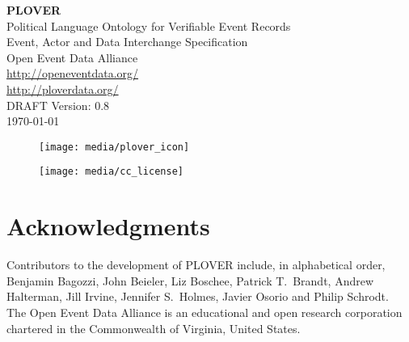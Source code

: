 \documentclass[11pt]{report}
\begin{document}

\vspace{-10pt}	

      \begin{center}
            {\Huge \bfseries PLOVER\ }\\[2ex] 
            {\LARGE Political Language Ontology for Verifiable Event Records\\ [2ex]Event, Actor and Data Interchange Specification}\\[10ex] 
            {\LARGE Open Event Data Alliance} \\[2ex] 
            {\Large \url{http://openeventdata.org/} }\\[2ex] 
            {\Large \url{http://ploverdata.org/} }\\[6ex]            
            {\LARGE DRAFT Version: 0.8\\ [2EX]\monthyeardate\today}
        \end{center}


\begin{figure}[h!]
\centering
\texttt{[image: media/plover\_icon]}
\end{figure}

\vspace{20pt}	


\begin{figure}[h!]
\centering
\texttt{[image: media/cc\_license]}
\end{figure}






\chapter*{Acknowledgments}

\noindent Contributors to the development of PLOVER include, in alphabetical order, Benjamin Bagozzi, John Beieler, Liz Boschee, Patrick T.~Brandt, Andrew Halterman, Jill Irvine, Jennifer S.~Holmes, Javier Osorio and Philip Schrodt.\\

\noindent The Open Event Data Alliance is an educational and open research corporation chartered in the Commonwealth of Virginia, United States.\\
\end{document}
